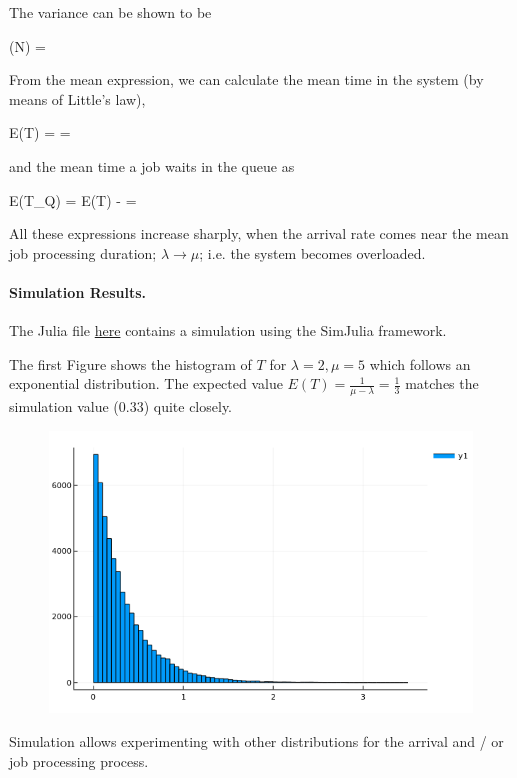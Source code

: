 The variance can be shown to be

\bee
{}(N) = 
\eee

From the mean expression, we can calculate the mean time in the system (by means of Little's law),

\bee
E(T) =  = 
\eee

and the mean time a job waits in the queue as

\bee
E(T_Q) = E(T) -  = \frac{\rho}{\mu - \lambda}
\eee

All these expressions increase sharply, when the arrival rate comes near the mean job processing duration; $\lambda \rightarrow \mu$; i.e. the system becomes overloaded.

\paragraph{Simulation Results.} The Julia file \href{https://github.com/ClemensFMN/JuliaStuff/blob/master/SimJulia/simple_queue.jl}{here} contains a simulation using the SimJulia framework.

The first Figure shows the histogram of $T$ for $\lambda=2, \mu=5 $ which follows an exponential distribution. The expected value $E(T)=\frac{1}{\mu - \lambda} = \frac{1}{3}$ matches the simulation value ($0.33$) quite closely.

\begin{figure}[hbt!]
\centering
\includegraphics[scale=0.4]{images/queuing_3_1.png}
\end{figure}

Simulation allows experimenting with other distributions for the arrival and / or job processing process.

